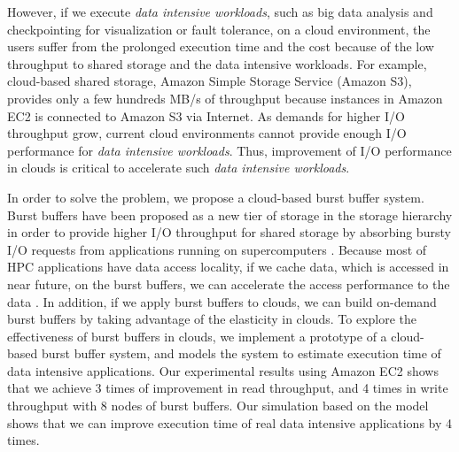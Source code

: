 However, if we execute \emph{data intensive workloads}, such as big data
analysis and checkpointing for visualization or fault tolerance, on a cloud environment, the
users suffer from the prolonged execution time and the cost because of the low
throughput to shared storage and the data intensive workloads.
For example, cloud-based shared storage, Amazon Simple Storage Service (Amazon
S3), provides only a few hundreds MB/s of throughput because instances
in Amazon EC2 is connected to Amazon S3 via Internet.
As demands for higher I/O throughput grow, 
current cloud environments cannot provide enough I/O performance for 
\emph{data intensive workloads}.
Thus, improvement of I/O performance in clouds is critical to accelerate such
\emph{data intensive workloads}.
\par
In order to solve the problem, we propose a cloud-based burst buffer system.
Burst buffers have been proposed as a new tier of storage in the storage
hierarchy in order to provide higher I/O throughput for shared storage by
absorbing bursty I/O requests from applications running on supercomputers
\cite{on_the_role_of_burst_buffers}.
Because most of HPC applications have data access
locality, if we cache data, which is accessed in near future, on the burst
buffers, we can accelerate the access performance to the data
.
In addition, if we apply burst buffers to clouds, we can build on-demand burst
buffers by taking advantage of the elasticity in clouds. 
To explore the effectiveness of burst buffers in clouds, 
we implement a prototype of a cloud-based burst buffer system, and models the
system to estimate execution time of data intensive applications.
Our experimental results using Amazon EC2 shows that we achieve 3 times of
improvement in read throughput, and 4 times in write throughput with 8 nodes of
burst buffers. Our simulation based on the model shows that we can
improve execution time of real data intensive applications by 4 times.
\par

